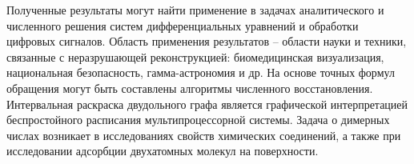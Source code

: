 Полученные результаты могут найти применение в задачах аналитического и численного решения систем дифференциальных уравнений и обработки цифровых сигналов.
Область применения результатов -- области науки и техники, связанные с неразрушающей реконструкцией: биомедицинская визуализация, национальная безопасность, гамма-астрономия и др. На основе точных формул обращения могут быть составлены алгоритмы численного восстановления.
Интервальная раскраска двудольного графа является графической интерпретацией беспростойного расписания мультипроцессорной системы. Задача о димерных числах возникает в исследованиях свойств химических соединений, а также при исследовании адсорбции двухатомных молекул на поверхности.
